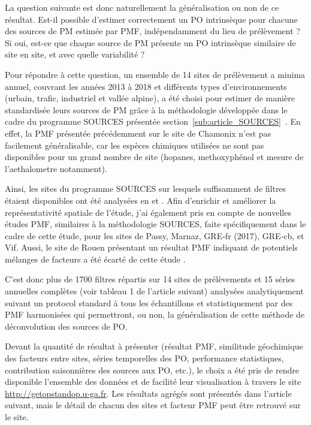 La question suivante est donc naturellement la généralisation ou non de ce résultat.
Est-il possible d'estimer correctement un PO intrinsèque pour chacune des sources de PM
estimée par PMF, indépendamment du lieu de prélèvement ? Si oui, est-ce que chaque source
de PM présente un PO intrinsèque similaire de site en site, et avec quelle variabilité ?

Pour répondre à cette question, un ensemble de 14 sites de prélèvement a minima annuel, couvrant les
années 2013 à 2018 et différents types d'environnements (urbain, trafic, industriel et vallée alpine),
a été choisi pour estimer de manière standardisée leurs sources de PM grâce à la
méthodologie développée dans le cadre du programme SOURCES présentée
section~\ref{sub:article_SOURCES}~\autocite{weberSources2019}. En effet, la PMF présentée précédemment sur le site de
Chamonix n'est pas facilement généralisable, car les espèces chimiques utilisées ne sont
pas disponibles pour un grand nombre de site (hopanes, methoxyphénol et mesure de
l'aethalometre notamment).

Ainsi, les sites du programme SOURCES sur lesquels suffisamment de filtres étaient
disponibles ont été analysées en \POAA{} et \PODTT. Afin d'enrichir et améliorer la
représentativité spatiale de l'étude, j'ai également pris en compte de nouvelles études
PMF, similaires à la méthodologie SOURCES, faite spécifiquement dans le cadre de cette
étude, pour les sites de Passy, Marnaz, GRE-fr (2017), GRE-cb, et Vif.
Aussi, le site de Rouen présentant un résultat PMF indiquant de potentiels mélanges de
facteurs a été écarté de cette étude \autocite{weberComparison2019}.

C'est donc plus de 1700 filtres répartis sur 14 sites de prélèvements et 15 séries
annuelles complètes (voir tableau 1 de l'article suivant) analysées analytiquement suivant
un protocol standard à tous les échantillons et statistiquement par des PMF harmonisées
qui permettront, ou non, la généralisation de cette méthode de déconvolution des sources
de PO.

\begin{tcolorbox}[colback=red!5!white,colframe=Melon,title=Note]
    Devant la quantité de résultat à présenter (résultat PMF, similitude géochimique des
    facteurs entre sites, séries temporelles des PO, performance statistiques,
    contribution saisonnières des sources aux PO, etc.), le choix a été pris de rendre
    disponible l'ensemble des données et de facilité leur visualisation à travers le site
    \url{http://getopstandop.u-ga.fr}.
    Les résultats agrégés sont présentés dans l'article suivant, mais le détail de chacun
    des sites et facteur PMF peut être retrouvé sur le site.
\end{tcolorbox}


